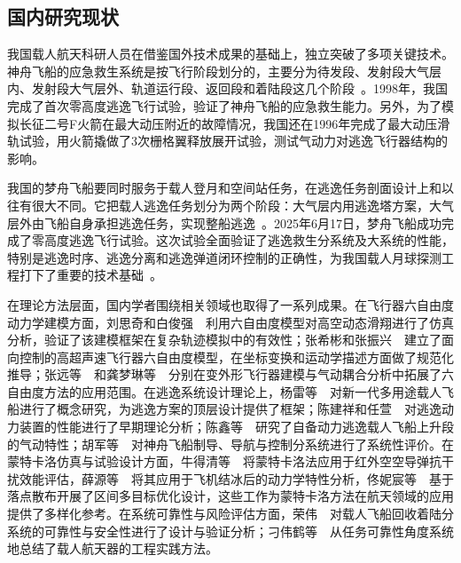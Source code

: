 \subsection{国内研究现状}

我国载人航天科研人员在借鉴国外技术成果的基础上，独立突破了多项关键技术。神舟飞船的应急救生系统是按飞行阶段划分的，主要分为待发段、发射段大气层内、发射段大气层外、轨道运行段、返回段和着陆段这几个阶段~\cite{李颐黎2022}。1998年，我国完成了首次零高度逃逸飞行试验，验证了神舟飞船的应急救生能力。另外，为了模拟长征二号F火箭在最大动压附近的故障情况，我国还在1996年完成了最大动压滑轨试验，用火箭撬做了3次栅格翼释放展开试验，测试气动力对逃逸飞行器结构的影响。

我国的梦舟飞船要同时服务于载人登月和空间站任务，在逃逸任务剖面设计上和以往有很大不同。它把载人逃逸任务划分为两个阶段：大气层内用逃逸塔方案，大气层外由飞船自身承担逃逸任务，实现整船逃逸~\cite{田林2023}。2025年6月17日，梦舟飞船成功完成了零高度逃逸飞行试验。这次试验全面验证了逃逸救生分系统及大系统的性能，特别是逃逸时序、逃逸分离和逃逸弹道闭环控制的正确性，为我国载人月球探测工程打下了重要的技术基础~\cite{苗志文2026,李喜晟2026}。

在理论方法层面，国内学者围绕相关领域也取得了一系列成果。在飞行器六自由度动力学建模方面，刘思奇和白俊强~\cite{刘思奇2021}~利用六自由度模型对高空动态滑翔进行了仿真分析，验证了该建模框架在复杂轨迹模拟中的有效性；张希彬和张振兴~\cite{张希彬2019}~建立了面向控制的高超声速飞行器六自由度模型，在坐标变换和运动学描述方面做了规范化推导；张远等~\cite{张远2022}~和龚梦琳等~\cite{龚梦琳2025}~分别在变外形飞行器建模与气动耦合分析中拓展了六自由度方法的应用范围。在逃逸系统设计理论上，杨雷等~\cite{杨雷2015新一代多用途载人飞船概念研究}~对新一代多用途载人飞船进行了概念研究，为逃逸方案的顶层设计提供了框架；陈建祥和任萱~\cite{陈建祥1996应急救生系统逃逸动力装置的性能分析}~对逃逸动力装置的性能进行了早期理论分析；陈鑫等~\cite{陈鑫2018自备动力逃逸载人飞船上升段气动特性研究}~研究了自备动力逃逸载人飞船上升段的气动特性；胡军等~\cite{胡军2004神舟飞船制导}~对神舟飞船制导、导航与控制分系统进行了系统性评价。在蒙特卡洛仿真与试验设计方面，牛得清等~\cite{牛得清2021}~将蒙特卡洛法应用于红外空空导弹抗干扰效能评估，薛源等~\cite{薛源2016}~将其应用于飞机结冰后的动力学特性分析，佟妮宸等~\cite{佟妮宸2022}~基于落点散布开展了区间多目标优化设计，这些工作为蒙特卡洛方法在航天领域的应用提供了多样化参考。在系统可靠性与风险评估方面，荣伟~\cite{荣伟2009载人飞船回收着陆分系统可靠性}~对载人飞船回收着陆分系统的可靠性与安全性进行了设计与验证分析；刁伟鹤等~\cite{刁伟鹤2025}~从任务可靠性角度系统地总结了载人航天器的工程实践方法。

